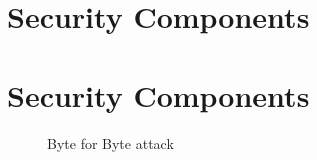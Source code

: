 \chapter{Security Components}



\chapter{Security Components}
\label{chap:sec-components}


\begin{figure}[H]
	\centering
	
	\caption{Byte for Byte attack} \label{fig:byte-for-byte}
\end{figure}